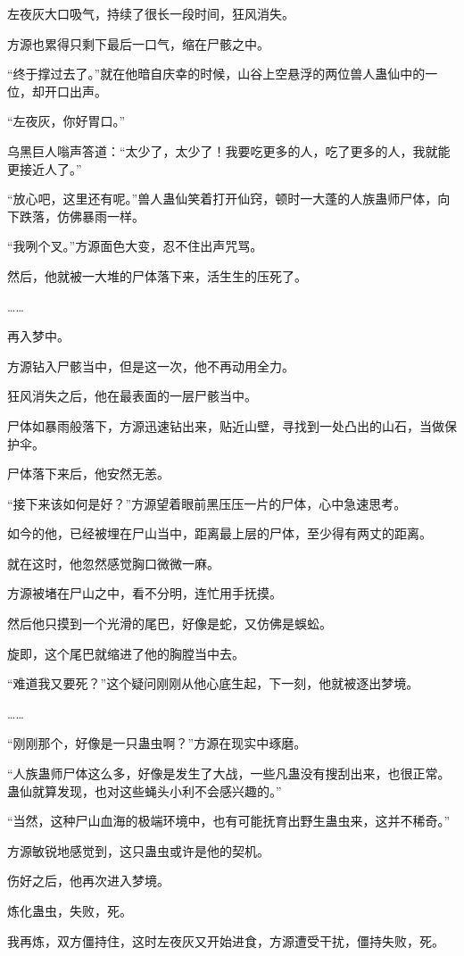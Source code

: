 \begin{this_body}
左夜灰大口吸气，持续了很长一段时间，狂风消失。

方源也累得只剩下最后一口气，缩在尸骸之中。

“终于撑过去了。”就在他暗自庆幸的时候，山谷上空悬浮的两位兽人蛊仙中的一位，却开口出声。

“左夜灰，你好胃口。”

乌黑巨人嗡声答道：“太少了，太少了！我要吃更多的人，吃了更多的人，我就能更接近人了。”

“放心吧，这里还有呢。”兽人蛊仙笑着打开仙窍，顿时一大蓬的人族蛊师尸体，向下跌落，仿佛暴雨一样。

“我咧个叉。”方源面色大变，忍不住出声咒骂。

然后，他就被一大堆的尸体落下来，活生生的压死了。

……

再入梦中。

方源钻入尸骸当中，但是这一次，他不再动用全力。

狂风消失之后，他在最表面的一层尸骸当中。

尸体如暴雨般落下，方源迅速钻出来，贴近山壁，寻找到一处凸出的山石，当做保护伞。

尸体落下来后，他安然无恙。

“接下来该如何是好？”方源望着眼前黑压压一片的尸体，心中急速思考。

如今的他，已经被埋在尸山当中，距离最上层的尸体，至少得有两丈的距离。

就在这时，他忽然感觉胸口微微一麻。

方源被堵在尸山之中，看不分明，连忙用手抚摸。

然后他只摸到一个光滑的尾巴，好像是蛇，又仿佛是蜈蚣。

旋即，这个尾巴就缩进了他的胸膛当中去。

“难道我又要死？”这个疑问刚刚从他心底生起，下一刻，他就被逐出梦境。

……

“刚刚那个，好像是一只蛊虫啊？”方源在现实中琢磨。

“人族蛊师尸体这么多，好像是发生了大战，一些凡蛊没有搜刮出来，也很正常。蛊仙就算发现，也对这些蝇头小利不会感兴趣的。”

“当然，这种尸山血海的极端环境中，也有可能抚育出野生蛊虫来，这并不稀奇。”

方源敏锐地感觉到，这只蛊虫或许是他的契机。

伤好之后，他再次进入梦境。

炼化蛊虫，失败，死。

我再炼，双方僵持住，这时左夜灰又开始进食，方源遭受干扰，僵持失败，死。


\end{this_body}
